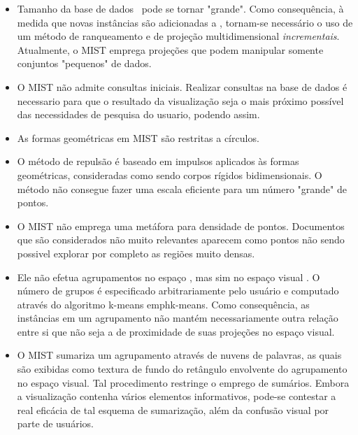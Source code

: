 \begin{itemize}
	\item Tamanho da base de dados \DB\ pode se tornar "grande". Como consequência, à medida que novas instâncias são adicionadas a \DB, 	tornam-se necessário o uso de um método de ranqueamento e de projeção 	multidimensional \emph{incrementais}. Atualmente, o MIST emprega projeções que podem manipular somente conjuntos "pequenos" de 	dados.
	
	\item O MIST não admite consultas iniciais. Realizar consultas na base de dados é necessario para que o resultado da visualização seja o mais próximo possível das necessidades de pesquisa do usuario, podendo assim.
	
	\item As formas geométricas em MIST são restritas a círculos. 
	
	\item O método de repulsão é baseado em impulsos aplicados às formas 	geométricas, consideradas como sendo corpos rígidos 	bidimensionais. O método não consegue fazer uma escala eficiente para um número "grande" de pontos.
	
%
%
	\item O MIST não emprega uma metáfora para densidade de pontos. Documentos que são considerados não muito relevantes aparecem como pontos não sendo possivel explorar por completo as regiões muito densas.
	
	\item Ele não efetua agrupamentos no espaço , mas sim no 	espaço visual . O número de grupos é especificado 	arbitrariamente pelo usuário e computado através do algoritmo k-means emph{k-means}. Como consequência, as instâncias em um agrupamento não mantém necessariamente outra relação entre si que não seja a de proximidade de suas projeções no espaço visual.
	
	\item O MIST sumariza um agrupamento através de nuvens de palavras, as quais são exibidas como textura de fundo do retângulo envolvente do agrupamento no espaço visual. Tal procedimento restringe o emprego	de sumários. Embora a visualização contenha vários elementos informativos, pode-se contestar a real eficácia de tal esquema de	sumarização, além da confusão visual por parte de usuários.
	
\end{itemize}


